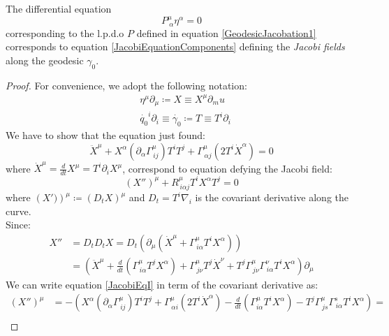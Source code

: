 \documentclass[Main]{subfiles}
\begin{document}
	
	\begin{proposition}
		The differential equation $$P^\mu_{\: \alpha} \eta^\alpha=0$$ corresponding to the l.p.d.o $P$ defined in equation \ref{GeodesicJacobation1} corresponds to equation \ref{JacobiEquationComponents} defining  the \emph{Jacobi fields} along the geodesic $\gamma_0$.
	\end{proposition}
	\begin{proof}
		For convenience, we adopt the following notation:
		\begin{align*}
		&\eta^\mu \partial_\mu \coloneqq X \equiv X^\mu \partial_mu \\
		&\dot{q_0}^i \partial_i \equiv \dot{\gamma_0} \coloneqq T \equiv T^i \partial_i
		\end{align*}
		We have to show that the equation just found:
		\begin{equation}\label{JacobiEqI}
			\ddot{X}^\mu + X^\alpha\left(\partial_\alpha\Gamma^{\mu}_{\, i j}\right)T^i T^j + \Gamma^\mu_{\, \alpha j}\left(2 T^i \dot{X}^\alpha \right) = 0
		\end{equation}
		where $\dot{X}^\mu = \frac{d}{dt}X^\mu= T^i \partial_i X^\mu$,
		correspond to equation defying the Jacobi field:
		\begin{equation}\label{JacobiEqII}
			\left(X'' \right)^\mu + R^\mu_{\, i \alpha j}T^i X^\alpha T^j = 0
		\end{equation}
		where $\left(X')\right)^\mu \coloneqq \left(D_t X \right)^\mu$ and $D_t = T^i \nabla_i$ is the covariant derivative along the curve.\\
		Since:
		\begin{align}\label{JacobiEqDerivative}
			X'' &= D_t D_t X = D_t \left( \partial_\mu \left( \dot{X}^\mu + \Gamma^\mu_{\, i \alpha} T^i X^\alpha \right)\right) \nonumber \\
			&=\left( \ddot{X}^\mu + \frac{d}{dt}\left( \Gamma^\mu_{\, i \alpha} T^j X^\alpha \right) + \Gamma^\mu_{\, j \nu}T^j \dot{X}^\nu + T^j \Gamma^\mu_{\, j \nu} \Gamma^\nu_{\, i \alpha} T^i X^\alpha \right)\partial_\mu
		\end{align}
		We can write equation \ref{JacobiEqI} in term of the covariant derivative as:
		\begin{align*}
			\left(X'' \right)^\mu &=
			- \left(
			X^\alpha\left(\partial_\alpha\Gamma^{\mu}_{\, i j}\right)T^i T^j + \Gamma^\mu_{\, \alpha i}\left(2 T^i \dot{X}^\alpha \right)
			- \frac{d}{dt}\left( \Gamma^\mu_{i \alpha} T^i X^\alpha \right) - T^j \Gamma^\mu_{\, j s} \Gamma^s_{\, i \alpha} T^i X^\alpha
			\right) =\\

\end{align*}
\end{proof}
\end{document}
